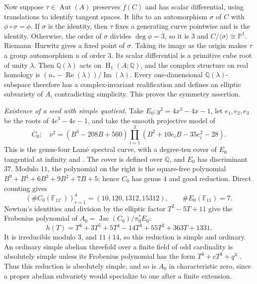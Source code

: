 \documentclass{amsart}
\DeclareMathOperator{\Aut}{Aut}
\DeclareMathOperator{\Hnm}{H}
\DeclareMathOperator{\Jac}{Jac}
\begin{document}
Now suppose $\tau\in\Aut(A)$ preserves $f(C)$ and has scalar
differential, using translations to identify tangent spaces. It lifts
to an automorphism $\sigma$ of $C$ with $\phi\circ\sigma=\phi$.
If $\sigma$ is the identity, then $\tau$ fixes a generating curve
pointwise and is the identity. Otherwise, the order of $\sigma$ divides
$\deg\phi=3$, so it is $3$ and
$C/\langle\sigma\rangle\cong\mathbb{P}^1$. Riemann--Hurwitz gives a
fixed point of $\sigma$. Taking its image as the origin makes $\tau$
a group automorphism $u$ of order $3$. Its scalar differential is a
primitive cube root of unity $\lambda$.
Then $\mathbb{Q}(\lambda)$ acts on $\Hnm_1(A;\mathbb{Q})$, and the
complex structure on real homology is
$\left(u_*-\operatorname{Re}(\lambda)\right)/\operatorname{Im}(\lambda)$.
Every one-dimensional $\mathbb{Q}(\lambda)$-subspace therefore has a
complex-invariant realification and defines an elliptic subvariety of
$A$, contradicting simplicity. This proves the symmetry assertion.

\medskip
\noindent\emph{Existence of a seed with simple quotient.}
Take $E_0:y^2=4x^3-4x-1$, let $e_1,e_2,e_3$ be the roots of
$4e^3-4e-1$, and take the smooth projective model of
\[
C_0:\quad \nu^2=(B^3-208B+560)
\prod_{i=1}^3\left(B^2+10e_iB-35e_i^2-28\right).
\]
This is the genus-four Lam\'e spectral curve, with a degree-ten cover
of $E_0$ tangential at infinity
\cite[Table~3 and Theorem~L]{maier} and \cite[Proposition~3.1 and the discussion
after (17)]{eilbeck}.
The cover is defined over $\mathbb{Q}$, and $E_0$ has discriminant $37$.
Modulo $11$, the polynomial on the right is the square-free polynomial
$B^9+B^4+6B^3+9B^2+7B+5$; hence $C_0$ has genus $4$ and good reduction.
Direct counting gives
\[
\left(\#C_0(\mathbb{F}_{11^r})\right)_{r=1}^4
=(10,120,1312,15312),\qquad \#E_0(\mathbb{F}_{11})=7.
\]
Newton's identities and division by the elliptic factor $T^2-5T+11$
give the Frobenius polynomial of $A_0=\Jac(C_0)/\pi_0^*E_0$:
\[
h(T)=T^6+3T^5+5T^4-14T^3+55T^2+363T+1331.
\]
It is irreducible modulo $3$, and $11\nmid14$, so this reduction is
simple and ordinary. An ordinary simple abelian threefold over a
finite field of odd cardinality is absolutely simple unless its
Frobenius polynomial has the form $T^6+cT^3+q^3$
\cite[Proposition~3.4]{arias}. Thus this reduction is absolutely simple,
and so is $A_0$ in characteristic zero, since a proper abelian
subvariety would specialize to one after a finite extension.
\end{document}
